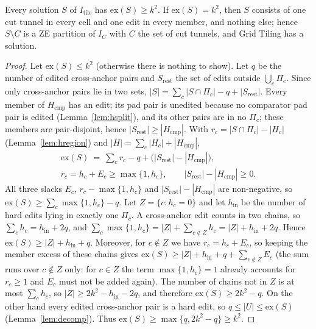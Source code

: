 \begin{theorem}[Soundness]\label{thm:hS}
Every solution $S$ of $I_{\mathrm{tile}}$ has $\mathrm{ex}(S)\ge k^2$. If $\mathrm{ex}(S)=k^2$, then $S$ consists of one cut tunnel in every cell and one edit in every member, and nothing else; hence $S\setminus C$ is a ZE partition of $I_C$ with $C$ the set of cut tunnels, and Grid Tiling has a solution.
\end{theorem}
\begin{proof}
Let $\mathrm{ex}(S)\le k^2$ (otherwise there is nothing to show). Let $q$ be the number of edited cross-anchor pairs and $S_{\mathrm{rest}}$ the set of edits outside $\bigcup_c\Pi_c$. Since only cross-anchor pairs lie in two sets, $|S|=\sum_c|S\cap\Pi_c|-q+|S_{\mathrm{rest}}|$. Every member of $H_{\mathrm{cmp}}$ has an edit; its pad pair is unedited because no comparator pad pair is edited (Lemma~\ref{lem:hsplit}), and its other pairs are in no $\Pi_c$; these members are pair-disjoint, hence $|S_{\mathrm{rest}}|\ge|H_{\mathrm{cmp}}|$. With $r_c=|S\cap\Pi_c|-|H_c|$ (Lemma~\ref{lem:hregion}) and $|H|=\sum_c|H_c|+|H_{\mathrm{cmp}}|$,
\[
\begin{gathered}\mathrm{ex}(S)\ =\ \sum_c r_c-q+\bigl(|S_{\mathrm{rest}}|-|H_{\mathrm{cmp}}|\bigr),\\ r_c=h_c+E_c\ge\max\{1,h_c\},\qquad |S_{\mathrm{rest}}|-|H_{\mathrm{cmp}}|\ge0 .\end{gathered}
\]
All three slacks $E_c$, $r_c-\max\{1,h_c\}$ and $|S_{\mathrm{rest}}|-|H_{\mathrm{cmp}}|$ are non-negative, so $\mathrm{ex}(S)\ge\sum_c\max\{1,h_c\}-q$.
Let $Z=\{c:h_c=0\}$ and let $h_{\mathrm{in}}$ be the number of hard edits lying in exactly one $\Pi_c$. A cross-anchor edit counts in two chains, so $\sum_ch_c=h_{\mathrm{in}}+2q$, and $\sum_c\max\{1,h_c\}=|Z|+\sum_{c\notin Z}h_c=|Z|+h_{\mathrm{in}}+2q$. Hence $\mathrm{ex}(S)\ge|Z|+h_{\mathrm{in}}+q$. Moreover, for $c\notin Z$ we have $r_c=h_c+E_c$, so keeping the member excess of these chains gives $\mathrm{ex}(S)\ge|Z|+h_{\mathrm{in}}+q+\sum_{c\notin Z}E_c$ (the sum runs over $c\notin Z$ only: for $c\in Z$ the term $\max\{1,h_c\}=1$ already accounts for $r_c\ge1$ and $E_c$ must not be added again). The number of chains not in $Z$ is at most $\sum_ch_c$, so $|Z|\ge2k^2-h_{\mathrm{in}}-2q$, and therefore $\mathrm{ex}(S)\ge2k^2-q$. On the other hand every edited cross-anchor pair is a hard edit, so $q\le|U|\le\mathrm{ex}(S)$ (Lemma~\ref{lem:decomp}). Thus $\mathrm{ex}(S)\ge\max\{q,2k^2-q\}\ge k^2$.


\end{proof}
